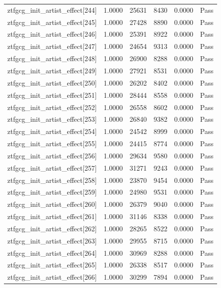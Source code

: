 \begin{table}[htbp]
\begin{tabular}{llrrll}
ztfgcg\_init\_artist\_effect[244] & 1.0000 & 25631 & 8430 & 0.0000 & Pass \\
ztfgcg\_init\_artist\_effect[245] & 1.0000 & 27428 & 8890 & 0.0000 & Pass \\
ztfgcg\_init\_artist\_effect[246] & 1.0000 & 25391 & 8922 & 0.0000 & Pass \\
ztfgcg\_init\_artist\_effect[247] & 1.0000 & 24654 & 9313 & 0.0000 & Pass \\
ztfgcg\_init\_artist\_effect[248] & 1.0000 & 26900 & 8288 & 0.0000 & Pass \\
ztfgcg\_init\_artist\_effect[249] & 1.0000 & 27921 & 8531 & 0.0000 & Pass \\
ztfgcg\_init\_artist\_effect[250] & 1.0000 & 26202 & 8402 & 0.0000 & Pass \\
ztfgcg\_init\_artist\_effect[251] & 1.0000 & 28444 & 8558 & 0.0000 & Pass \\
ztfgcg\_init\_artist\_effect[252] & 1.0000 & 26558 & 8602 & 0.0000 & Pass \\
ztfgcg\_init\_artist\_effect[253] & 1.0000 & 26840 & 9382 & 0.0000 & Pass \\
ztfgcg\_init\_artist\_effect[254] & 1.0000 & 24542 & 8999 & 0.0000 & Pass \\
ztfgcg\_init\_artist\_effect[255] & 1.0000 & 24415 & 8774 & 0.0000 & Pass \\
ztfgcg\_init\_artist\_effect[256] & 1.0000 & 29634 & 9580 & 0.0000 & Pass \\
ztfgcg\_init\_artist\_effect[257] & 1.0000 & 31271 & 9243 & 0.0000 & Pass \\
ztfgcg\_init\_artist\_effect[258] & 1.0000 & 23870 & 9454 & 0.0000 & Pass \\
ztfgcg\_init\_artist\_effect[259] & 1.0000 & 24980 & 9531 & 0.0000 & Pass \\
ztfgcg\_init\_artist\_effect[260] & 1.0000 & 26379 & 9040 & 0.0000 & Pass \\
ztfgcg\_init\_artist\_effect[261] & 1.0000 & 31146 & 8338 & 0.0000 & Pass \\
ztfgcg\_init\_artist\_effect[262] & 1.0000 & 28265 & 8522 & 0.0000 & Pass \\
ztfgcg\_init\_artist\_effect[263] & 1.0000 & 29955 & 8715 & 0.0000 & Pass \\
ztfgcg\_init\_artist\_effect[264] & 1.0000 & 30969 & 8288 & 0.0000 & Pass \\
ztfgcg\_init\_artist\_effect[265] & 1.0000 & 26338 & 8517 & 0.0000 & Pass \\
ztfgcg\_init\_artist\_effect[266] & 1.0000 & 30299 & 7894 & 0.0000 & Pass \\

\end{tabular}
\end{table}
